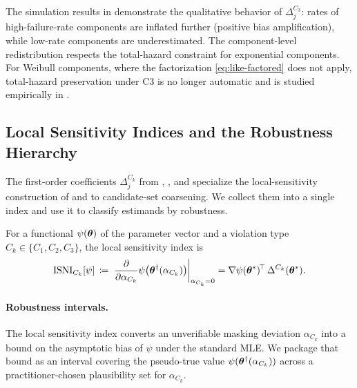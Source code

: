 The simulation results in  demonstrate the
qualitative behavior of $\Delta_j^{C_3}$: rates of high-failure-rate
components are inflated further (positive bias amplification), while
low-rate components are underestimated. The component-level redistribution
respects the total-hazard constraint for exponential components. For
Weibull components, where the factorization \eqref{eq:like-factored} does
not apply, total-hazard preservation under C3 is no longer automatic and
is studied empirically in .

\subsection{Local Sensitivity Indices and the Robustness Hierarchy}
\label{sec:hierarchy}

The first-order coefficients $\Delta_j^{C_k}$ from
, , and 
specialize the local-sensitivity construction of
\citet{TroxelMaHeitjan2004} and \citet{ZhangHeitjan2006} to candidate-set
coarsening. We collect them into a single index and use it to classify
estimands by robustness.

\begin{definition}
\label{def:isni}
For a functional $\psi(\bm{\theta})$ of the parameter vector and a violation
type $C_k \in \{C_1, C_2, C_3\}$, the local sensitivity index is
\begin{equation}
\label{eq:isni}
    \mathrm{ISNI}_{C_k}[\psi]
    \,\coloneqq\,
    \left.
        \frac{\partial}{\partial \alpha_{C_k}}
        \psi\bigl(\bm{\theta}^\dagger(\alpha_{C_k})\bigr)
    \right|_{\alpha_{C_k} = 0}
    = \nabla \psi(\bm{\theta}^*)^{\!\top}\, \Delta^{C_k}(\bm{\theta}^*).
\end{equation}
\end{definition}

\paragraph{Robustness intervals.}
The local sensitivity index converts an unverifiable masking deviation
$\alpha_{C_k}$ into a bound on the asymptotic bias of $\psi$ under the
standard MLE. We package that bound as an interval covering the
pseudo-true value $\psi(\bm{\theta}^\dagger(\alpha_{C_k}))$ across a
practitioner-chosen plausibility set for $\alpha_{C_k}$.

